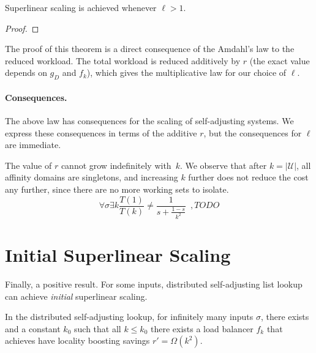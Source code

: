 Superlinear scaling is achieved whenever $\ell > 1$.

\begin{proof}
\end{proof}


The proof of this theorem is a direct consequence of the Amdahl's law to the reduced workload. The total workload is reduced additively by $r$ (the exact value depends on $g_D$ and $f_k$), which gives the multiplicative law for our choice of $\ell$.


\paragraph*{Consequences.}
The above law has consequences for the scaling of self-adjusting systems. We express these consequences in terms of the additive $r$, but the consequences for $\ell$ are immediate.

The value of $r$ cannot grow indefinitely with~$k$.
We observe that after $k = |\mathcal{U}|$, all affinity domains are singletons, and increasing $k$ further does not reduce the cost any further, since there are no more working sets to isolate.
\begin{equation*}\label{eq:mtf-perf}
 \forall \sigma \exists k \frac{T(1)}{T(k)} \neq \frac1{s + \frac{1-s}{k^2}} \enspace ,
 TODO
\end{equation*}



\section{Initial Superlinear Scaling}

Finally, a positive result.
For some inputs, distributed self-adjusting list lookup can achieve \emph{initial} superlinear scaling.

\begin{observation}
	\label{obs:list-k2}
	In the distributed self-adjusting lookup, 
	for infinitely many inputs $\sigma$, there exists  and a constant $k_0$ such that all $k \le k_0$ there exists a load balancer $f_k$ that achieves have locality boosting savings $r' = \Omega(k^2)$.
\end{observation}

